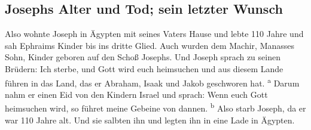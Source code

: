 \hypertarget{josephs-alter-und-tod-sein-letzter-wunsch}{%
\subsection{Josephs Alter und Tod; sein letzter
Wunsch}\label{josephs-alter-und-tod-sein-letzter-wunsch}}

 Also wohnte Joseph in Ägypten mit seines Vaters Hause
und lebte 110 Jahre  und sah Ephraims Kinder bis ins
dritte Glied. Auch wurden dem Machir, Manasses Sohn, Kinder geboren auf
den Schoß Josephs.  Und Joseph sprach zu seinen Brüdern:
Ich sterbe, und Gott wird euch heimsuchen und aus diesem Lande führen in
das Land, das er Abraham, Isaak und Jakob geschworen hat.
\textsuperscript{a}  Darum nahm er einen Eid von den
Kindern Israel und sprach: Wenn euch Gott heimsuchen wird, so führet
meine Gebeine von dannen. \textsuperscript{b}  Also starb
Joseph, da er war 110 Jahre alt. Und sie salbten ihn und legten ihn in
eine Lade in Ägypten.
